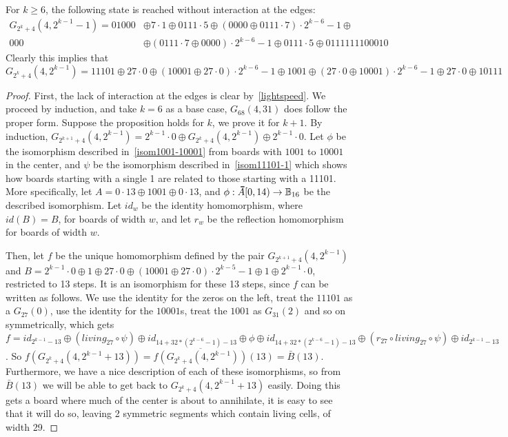 \documentclass[12pt,letterpaper]{article}
\begin{document}
\begin{prop}\label{1111BoardsBig}
  For $k\geq 6$, the following state is reached without interaction at the edges:
  \begin{align*}
    G_{2^k+4}(4, 2^{k-1}-1)=01000 &\oplus 7\cdot 1\oplus 0111\cdot 5\oplus (0000 \oplus 0111\cdot 7)\cdot 2^{k-6}-1\oplus \\
    000 &\oplus (0111\cdot 7\oplus 0000) \cdot 2^{k-6}-1\oplus 0111\cdot 5\oplus 0111111100010
  \end{align*}
  Clearly this implies that $$G_{2^k+4}(4, 2^{k-1}) = 11101\oplus 27\cdot 0\oplus (10001\oplus 27\cdot 0)\cdot 2^{k-6}-1\oplus 1001\oplus (27\cdot 0\oplus 10001)\cdot 2^{k-6}-1\oplus 27\cdot 0\oplus 10111$$
\end{prop}
\begin{proof}
  First, the lack of interaction at the edges is clear by~\cref{lightspeed}. We proceed by induction, and take $k=6$ as a base case, $G_{68}(4, 31)$ does follow the proper form. Suppose the proposition holds for $k$, we prove it for $k+1$. By induction, $G_{2^{k+1}+4}(4,2^{k-1})=2^{k-1}\cdot 0\oplus G_{2^k+4}(4,2^{k-1})\oplus 2^{k-1}\cdot 0$. Let $\phi$ be the isomorphism described in~\cref{isom1001-10001} from boards with $1001$ to $10001$ in the center, and $\psi$ be the isomorphism described in~\cref{isom11101-1} which shows how boards starting with a single 1 are related to those starting with a 11101. More specifically, let $A=0\cdot 13\oplus 1001\oplus 0\cdot 13$, and $\phi:\bar{A}[0,14)\rightarrow \B_{16}$ be the described isomorphism. Let $id_w$ be the identity homomorphism, where $id(B)=B$, for boards of width $w$, and let $r_w$ be the reflection homomorphism for boards of width $w$.
  
  Then, let $f$ be the unique homomorphism defined by the pair $G_{2^{k+1}+4}(4,2^{k-1})$ and $B=2^{k-1}\cdot 0\oplus 1\oplus 27\cdot 0\oplus (10001\oplus 27\cdot0)\cdot 2^{k-5}-1\oplus 1\oplus 2^{k-1}\cdot 0$, restricted to 13 steps. It is an isomorphism for these 13 steps, since $f$ can be written as follows. We use the identity for the zeros on the left, treat the $11101$ as a $G_{27}(0)$, use the identity for the $10001$s, treat the $1001$ as $G_{31}(2)$ and so on symmetrically, which gets $f=id_{2^{k-1}-13}\oplus (living_{27}\circ \psi)\oplus id_{14+32*(2^{k-6}-1)-13}\oplus \phi\oplus id_{14+32*(2^{k-6}-1)-13}\oplus (r_{27}\circ living_{27}\circ \psi)\oplus id_{2^{k-1}-13}$. So $f(G_{2^k+4}(4,2^{k-1}+13))=\overline{f(G_{2^k+4}(4,2^{k-1}))}(13)=\bar{B}(13)$. Furthermore, we have a nice description of each of these isomorphisms, so from $\bar{B}(13)$ we will be able to get back to $G_{2^k+4}(4,2^{k-1}+13)$ easily. Doing this gets a board where much of the center is about to annihilate, it is easy to see that it will do so, leaving 2 symmetric segments which contain living cells, of width 29.


\end{proof}
\end{document}
